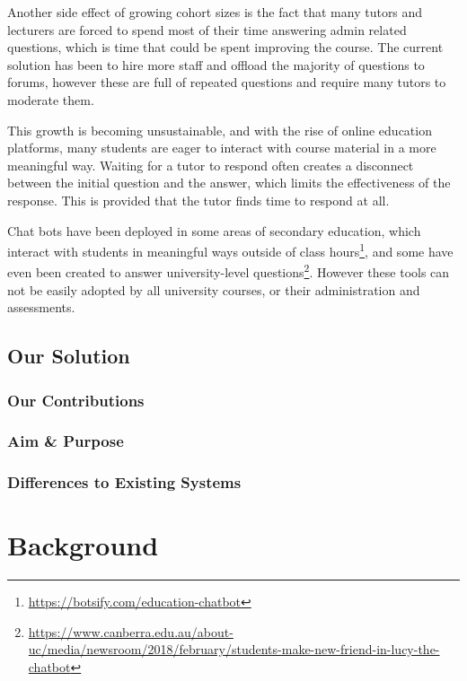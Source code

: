 \documentclass{article}
\begin{document}
Another side effect of growing cohort sizes is the fact that many tutors and lecturers are forced to spend most of their time answering admin related questions, which is time that could be spent improving the course. The current solution has been to hire more staff and offload the majority of questions to forums, however these are full of repeated questions and require many tutors to moderate them.

This growth is becoming unsustainable, and with the rise of online education platforms, many students are eager to interact with course material in a more meaningful way. Waiting for a tutor to respond often creates a disconnect between the initial question and the answer, which limits the effectiveness of the response. This is provided that the tutor finds time to respond at all.

Chat bots have been deployed in some areas of secondary education, which interact with students in meaningful ways outside of class hours\footnote{\url{https://botsify.com/education-chatbot}}, and some have even been created to answer university-level questions\footnote{\url{https://www.canberra.edu.au/about-uc/media/newsroom/2018/february/students-make-new-friend-in-lucy-the-chatbot}}. However these tools can not be easily adopted by all university courses, or their administration and assessments.

\subsection{Our Solution}

\subsubsection{Our Contributions}

\subsubsection{Aim \& Purpose}

\subsubsection{Differences to Existing Systems}


\newpage
\section{Background}
\end{document}
